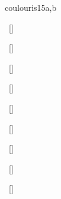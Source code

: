 \begin{syllabus}
\begin{unit}{\PDDistributedSystems}{}{coulouris}{15}{a,b}
\begin{topics}%
    \item \PDDistributedSystemsTopicFaults
    \item \PDDistributedSystemsTopicDistributed
    \item \PDDistributedSystemsTopicDistributedSystem
    \item \PDDistributedSystemsTopicDistributedService
    \item \PDDistributedSystemsTopicCore
\end{topics}
\begin{learningoutcomes}%
    \item \PDDistributedSystemsLODistinguishNetwork~[\Familiarity] %
    \item \PDDistributedSystemsLOExplainWhySuch~[\Familiarity] %
    \item \PDDistributedSystemsLOWriteAPerforms~[\Usage] %
    \item \PDDistributedSystemsLOMeasure~[\Usage] %
    \item \PDDistributedSystemsLOExplainWhySystem~[\Familiarity] %
    \item \PDDistributedSystemsLOImplementAForSpell~[\Usage] %
    \item \PDDistributedSystemsLOExplainTheOverhead~[\Familiarity] %
    \item \PDDistributedSystemsLODescribeTheAssociated~[\Familiarity] %
    \item \PDDistributedSystemsLOGiveExamplesFor~[\Usage] %
\end{learningoutcomes}%
\end{unit}


\end{syllabus}

